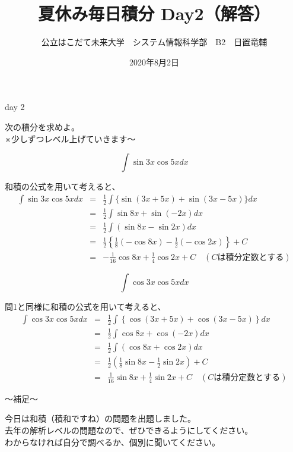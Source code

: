 \documentclass[dvipdfmx,uplatex]{jsarticle}
\title{夏休み毎日積分 Day2（解答）}
\author{公立はこだて未来大学　システム情報科学部　B2　日置竜輔}
\date{2020年8月2日}
\begin{document}
\maketitle

\begin{itembox}[c]{day 2}
    \begin{center}
        次の積分を求めよ。\\
        ※少しずつレベル上げていきます〜
    \end{center}
\end{itembox}

\begin{qparts}
  \qpart
  \begin{equation*}
    \int \sin 3x \cos 5x dx
  \end{equation*}

和積の公式を用いて考えると、
\begin{eqnarray*}
    \int \sin 3x \cos 5xdx
    & = & \frac{1}{2} \int \{ \sin (3x+5x) + \sin (3x-5x) \} dx \\
    & = & \frac{1}{2} \int \sin 8x + \sin (-2x) dx \\
    & = & \frac{1}{2} \int (\sin 8x - \sin 2x) dx \\
    & = & \frac{1}{2} \left\{ \frac{1}{8} (-\cos 8x) - \frac{1}{2} (-\cos 2x) \right\} + C \\
    & = & -\frac{1}{16} \cos 8x + \frac{1}{4} \cos 2x + C \quad (Cは積分定数とする)
\end{eqnarray*}

\newpage

  \qpart
  \begin{equation*}
    \int \cos 3x \cos 5x dx
  \end{equation*}

問1と同様に和積の公式を用いて考えると、
\begin{eqnarray*}
    \int \cos 3x \cos 5x dx & = & \frac{1}{2} \int \left\{ \cos (3x+5x) + \cos (3x - 5x) \right\} dx \\
    & = & \frac{1}{2} \int \cos 8x + \cos (-2x) dx \\
    & = & \frac{1}{2} \int \left( \cos 8x + \cos 2x \right) dx \\
    & = & \frac{1}{2} \left( \frac{1}{8} \sin 8x - \frac{1}{2} \sin 2x \right) + C \\
    & = & \frac{1}{16}\sin 8x + \frac{1}{4} \sin 2x + C \quad (Cは積分定数とする)
\end{eqnarray*}
\end{qparts}

\begin{boxnote}
    〜補足〜
    \begin{center}
        今日は和積（積和ですね）の問題を出題しました。\\
        去年の解析レベルの問題なので、ぜひできるようにしてください。 \\
        わからなければ自分で調べるか、個別に聞いてください。
    \end{center}
\end{boxnote}
\end{document}
